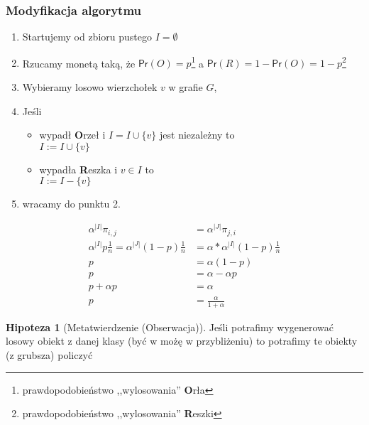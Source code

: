 \documentclass[a4paper,12pt]{article}
\theoremstyle{definition}%
\theoremstyle{definition}
\newtheorem{hipoterm}{Hipoteza}%
\theoremstyle{problem}
\begin{document}
\subsubsection{Modyfikacja algorytmu}
\begin{enumerate}
\item Startujemy od zbioru pustego $I=\emptyset $
\item Rzucamy monetą taką, że $\mathsf{Pr}(O)=p$\footnote{prawdopodobieństwo ,,wylosowania'' \textbf{O}rła} a $\mathsf{Pr}(R)=1-\mathsf{Pr}(O)=1-p$\footnote{prawdopodobieństwo ,,wylosowania'' \textbf{R}eszki}
\item Wybieramy losowo wierzchołek $v$ w grafie $G$,
\item Jeśli 
\begin{itemize}
\item[] wypadł \textbf{O}rzeł i $I=I\cup \{v\}$ jest niezależny to\\
$I:=I\cup \{v\}$
\item[] wypadła \textbf{R}eszka i $v\in I$ to\\
$I:=I- \{v\}$
\end{itemize}
\item wracamy do punktu 2.
\end{enumerate}

\begin{align*}
\alpha ^{|I|}\pi_{i,j}&=\alpha ^{|J|}\pi_{j,i}\\
\alpha ^{|I|}p\frac{1}{n}=\alpha ^{|J|}(1-p)\frac{1}{n}&=\alpha *\alpha ^{|I|}(1-p)\frac{1}{n}\\
p&=\alpha (1-p)\\
p&=\alpha -\alpha p\\
p+\alpha p&=\alpha\\
p&=\frac{\alpha}{1+\alpha}
\end{align*}

\begin{hipoterm}[Metatwierdzenie (Obserwacja)]
Jeśli potrafimy wygenerować losowy obiekt z danej klasy (być w możę w przybliżeniu) to potrafimy te obiekty (z grubsza) policzyć
\end{hipoterm}
\end{document}
